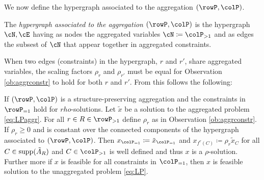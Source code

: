 We now define the hypergraph associated to the aggregation \((\rowP, \colP)\).
\begin{definition}
  The \emph{hypergraph associated to the aggregation \((\rowP, \colP)\)} is the hypergraph \(\cN, \cE\) having as nodes the aggregated variables \(\cN \coloneqq \colP_{>1}\) and as edges the subsest of \(\cN\) that appear together in aggregated constraints.
\end{definition}

When two edges (constraints) in the hypergraph, \(r\) and \(r'\), share aggregated variables, 
the scaling factors \(\rho_r\) and \(\rho_{r'}\) must be equal for Observation \ref{ob:aggrconstr} to hold for both \(r\) and \(r'\). 
From this follows the following:
\begin{proposition}
\label{prop:xaggfeasible}
If \((\rowP, \colP)\) is a structure-preserving aggregation and the constraints in \(\rowP_{=1}\) hold for \(rho\)-solutions. Let \(\tilde{x}\) be a solution 
to the aggregated problem \eqref{eq:LPaggr}. For all \(r \in R \in \rowP_{>1}\) define \(\rho_r\) as in Observation \ref{ob:aggrconstr}. If \(\rho_r \geq 0\) and is constant over the connected components of the hypergraph associated to \((\rowP, \colP)\). 
Then \(x_{\colP_{=1}} \coloneqq \tilde{x}_{\colP_{=1}}\) and \(x_{f^r(C)} \coloneqq \rho_r \tilde{x}_C\) for all \(C \in \operatorname{supp}(\tilde{A}_R)\) and \(C \in \colP_{>1}\) is well defined and thus \(x\) is a \(\rho\)-solution.
Further more if \(x\) is feasible for all constraints in \(\colP_{=1}\), then \(x\) is feasible solution to the unaggregated problem \eqref{eq:LP}.
\end{proposition}

